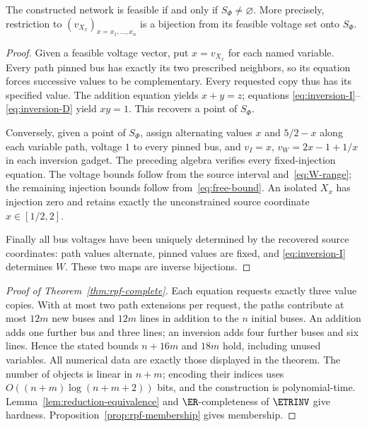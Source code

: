 \begin{lemma}
\label{lem:reduction-equivalence}
The constructed network is feasible if and only if $S_\Phi\ne\varnothing$.
More precisely, restriction to $(v_{X_x})_{x= x_1,\ldots,x_n}$ is a bijection
from its feasible voltage set onto $S_\Phi$.
\end{lemma}
\begin{proof}
Given a feasible voltage vector, put $x=v_{X_x}$ for each named variable.
Every path pinned bus has exactly its two prescribed neighbors, so its
equation forces successive values to be complementary. Every requested copy
thus has its specified value. The addition equation yields $x+y=z$; equations
\eqref{eq:inversion-I}--\eqref{eq:inversion-D} yield $xy=1$. This recovers a
point of $S_\Phi$.

Conversely, given a point of $S_\Phi$, assign alternating values $x$ and
$5/2-x$ along each variable path, voltage $1$ to every pinned bus, and
$v_I=x$, $v_W=2x-1+1/x$ in each inversion gadget. The preceding algebra
verifies every fixed-injection equation. The voltage bounds follow from the
source interval and~\eqref{eq:W-range}; the remaining injection bounds follow
from~\eqref{eq:free-bound}. An isolated $X_x$ has injection zero and retains
exactly the unconstrained source coordinate $x\in[1/2,2]$.

Finally all bus voltages have been uniquely determined by the recovered
source coordinates: path values alternate, pinned values are fixed, and
\eqref{eq:inversion-I} determines $W$. These two maps are inverse bijections.
\end{proof}

\begin{proof}[Proof of Theorem~\ref{thm:rpf-complete}]
Each equation requests exactly three value copies. With at most two path
extensions per request, the paths contribute at most $12m$ new buses and
$12m$ lines in addition to the $n$ initial buses. An addition adds one
further bus and three lines; an inversion adds four further buses and six
lines. Hence the stated bounds $n+16m$ and $18m$ hold, including unused
variables. All numerical data are exactly those displayed in the theorem.
The number of objects is linear in $n+m$; encoding their indices uses
$O((n+m)\log(n+m+2))$ bits, and the construction is polynomial-time.
Lemma~\ref{lem:reduction-equivalence} and $\ER$-completeness of $\ETRINV$
give hardness. Proposition~\ref{prop:rpf-membership} gives membership.
\end{proof}

